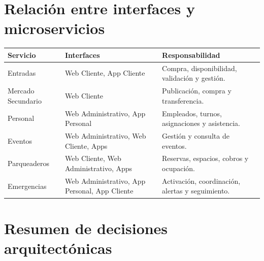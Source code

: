 \documentclass[12pt,a4paper]{article}
\begin{document}
\begin{center}
\end{center}

\section{Relación entre interfaces y microservicios}

\begin{longtable}{p{4cm}p{4cm}p{6cm}}
\toprule
\textbf{Servicio} & \textbf{Interfaces} & \textbf{Responsabilidad}\\
\midrule
Entradas & Web Cliente, App Cliente & Compra, disponibilidad, validación y gestión.\\
Mercado Secundario & Web Cliente & Publicación, compra y transferencia.\\
Personal & Web Administrativo, App Personal & Empleados, turnos, asignaciones y asistencia.\\
Eventos & Web Administrativo, Web Cliente, Apps & Gestión y consulta de eventos.\\
Parqueaderos & Web Cliente, Web Administrativo, Apps & Reservas, espacios, cobros y ocupación.\\
Emergencias & Web Administrativo, App Personal, App Cliente & Activación, coordinación, alertas y seguimiento.\\
\bottomrule
\end{longtable}

\section{Resumen de decisiones arquitectónicas}
\end{document}
